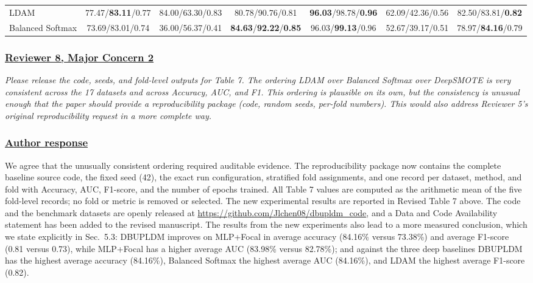 \documentclass[journal,12pt, onecolumn]{IEEEtran}
\begin{document}
{\begin{table}[htbp]
{\begin{tabular}{lcccccc}
    LDAM             & {\color{red}77.47}/\textbf{\color{red}83.11}/{\color{red}0.77} & {\color{red}84.00}/{\color{red}63.30}/{\color{red}0.83} & {\color{red}80.78}/{\color{red}90.76}/{\color{red}0.81} & \textbf{\color{red}96.03}/{\color{red}98.78}/\textbf{\color{red}0.96} & {\color{red}62.09}/{\color{red}42.36}/{\color{red}0.56} & {\color{red}82.50}/{\color{red}83.81}/\textbf{\color{red}0.82} \\
    Balanced Softmax & {\color{red}73.69}/{\color{red}83.01}/{\color{red}0.74} & {\color{red}36.00}/{\color{red}56.37}/{\color{red}0.41} & \textbf{\color{red}84.63}/\textbf{\color{red}92.22}/\textbf{\color{red}0.85} & {\color{red}96.03}/\textbf{\color{red}99.13}/{\color{red}0.96} & {\color{red}52.67}/{\color{red}39.17}/{\color{red}0.51} & {\color{red}78.97}/\textbf{\color{red}84.16}/{\color{red}0.79} \\
    \bottomrule
  \end{tabular}
  }
  \label{tab:table7_response}
\end{table}
}

{\color{customgreen}
\subsubsection*{\underline{\textbf{Reviewer 8, Major Concern 2}}}
\emph{Please release the code, seeds, and fold-level outputs for Table 7. The ordering LDAM over Balanced Softmax over DeepSMOTE is very consistent across the 17 datasets and across Accuracy, AUC, and F1. This ordering is plausible on its own, but the consistency is unusual enough that the paper should provide a reproducibility package (code, random seeds, per-fold numbers). This would also address Reviewer 5's original reproducibility request in a more complete way.}
}


{\color{black}
\subsubsection*{\textbf{\underline{Author response}}}
We agree that the unusually consistent ordering required auditable evidence. The reproducibility package now contains the complete baseline source code, the fixed seed (42), the exact run configuration, stratified fold assignments, and one record per dataset, method, and fold with Accuracy, AUC, F1-score, and the number of epochs trained. All Table 7 values are computed as the arithmetic mean of the five fold-level records; no fold or metric is removed or selected. The new experimental results are reported in Revised Table 7 above. The code and the benchmark datasets are openly released at \url{https://github.com/Jlchen08/dbupldm_code}, and a Data and Code Availability statement has been added to the revised manuscript. The results from the new experiments also lead to a more measured conclusion, which we state explicitly in Sec.~5.3: DBUPLDM improves on MLP+Focal in average accuracy (84.16\% versus 73.38\%) and average F1-score (0.81 versus 0.73), while MLP+Focal has a higher average AUC (83.98\% versus 82.78\%); and against the three deep baselines DBUPLDM has the highest average accuracy (84.16\%), Balanced Softmax the highest average AUC (84.16\%), and LDAM the highest average F1-score (0.82).
}
\end{document}

